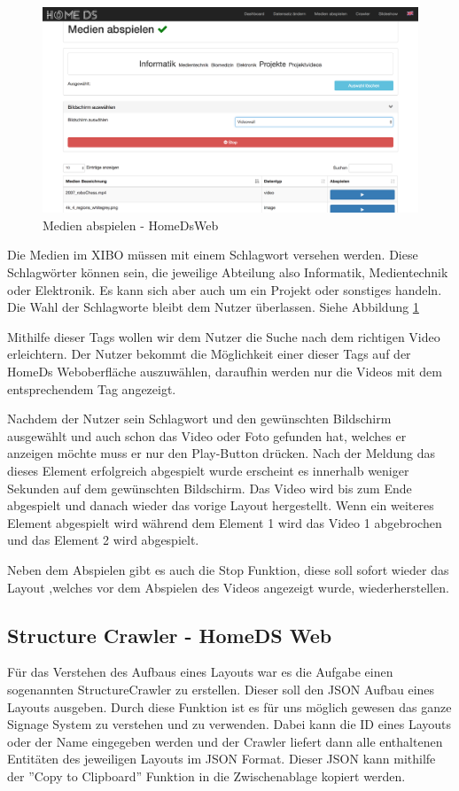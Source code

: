 \begin{figure}[H]
\centering
\includegraphics[width=1\textwidth]{images/08_HomeDsWeb/PlayMediaOverview.png}
\caption{Medien abspielen - HomeDsWeb}
\label{img:playmedia}
\end{figure}

Die Medien im XIBO müssen mit einem Schlagwort versehen werden. Diese Schlagwörter können sein, die jeweilige Abteilung also Informatik, Medientechnik oder Elektronik. Es kann sich aber auch um ein Projekt oder sonstiges handeln. Die Wahl der Schlagworte bleibt dem Nutzer überlassen.  Siehe Abbildung \ref{img:playmedia}

Mithilfe dieser Tags wollen wir dem Nutzer die Suche nach dem richtigen Video erleichtern. Der Nutzer bekommt die Möglichkeit einer dieser Tags auf der HomeDs Weboberfläche auszuwählen, daraufhin werden nur die Videos mit dem entsprechendem Tag angezeigt.

Nachdem der Nutzer sein Schlagwort und den gewünschten Bildschirm ausgewählt und auch schon das Video oder Foto gefunden hat, welches er anzeigen möchte muss er nur den Play-Button drücken. Nach der Meldung das dieses Element erfolgreich abgespielt wurde erscheint es innerhalb weniger Sekunden auf dem gewünschten Bildschirm. Das Video wird bis zum Ende abgespielt und danach wieder das vorige Layout hergestellt. Wenn ein weiteres Element abgespielt wird während dem Element 1 wird das Video 1 abgebrochen und das Element 2 wird abgespielt.

Neben dem Abspielen gibt es auch die Stop Funktion, diese soll sofort wieder das Layout ,welches vor dem Abspielen des Videos angezeigt wurde, wiederherstellen.


\subsection{Structure Crawler - HomeDS Web}\label{sec:javaeestructurecrawler}
Für das Verstehen des Aufbaus eines Layouts war es die Aufgabe einen sogenannten StructureCrawler zu erstellen. Dieser soll den JSON Aufbau eines Layouts ausgeben. Durch diese Funktion ist es für uns möglich gewesen das ganze Signage System zu verstehen und zu verwenden. Dabei kann die ID eines Layouts oder der Name eingegeben werden und der Crawler liefert dann alle enthaltenen Entitäten des jeweiligen Layouts im JSON Format. Dieser JSON kann mithilfe der ''Copy to Clipboard'' Funktion in die Zwischenablage kopiert werden.

